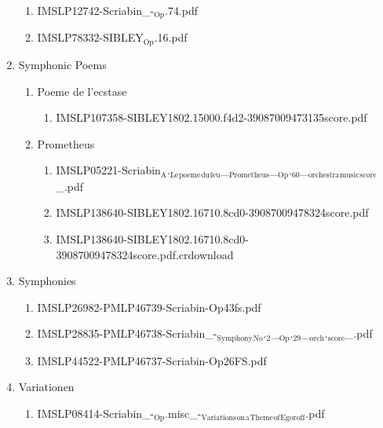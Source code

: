 \documentclass[11pt]{article}
\begin{document}
\begin{enumerate}
\begin{enumerate}
\item IMSLP12742-Scriabin\_-$_{\text{Op}}$.74.pdf
\label{sec-1-1-1-1-44-63-13-16}

\item IMSLP78332-SIBLEY$_{\text{Op}}$.16.pdf
\label{sec-1-1-1-1-44-63-13-17}
\end{enumerate}

\item Symphonic Poems
\label{sec-1-1-1-1-44-63-14}
\begin{enumerate}
\item Poeme de l'ecstase
\label{sec-1-1-1-1-44-63-14-1}
\begin{enumerate}
\item IMSLP107358-SIBLEY1802.15000.f4d2-39087009473135score.pdf
\label{sec-1-1-1-1-44-63-14-1-1}
\end{enumerate}

\item Prometheus
\label{sec-1-1-1-1-44-63-14-2}
\begin{enumerate}
\item IMSLP05221-Scriabin$_{\text{A}}$.$_{\text{Le}}$$_{\text{poeme}}$$_{\text{du}}$$_{\text{feu}}$\_$_{\text{Prometheus}}$\_$_{\text{Op}}$.$_{\text{60}}$\_$_{\text{orchestra}}$$_{\text{music}}$$_{\text{score}}$\_.pdf
\label{sec-1-1-1-1-44-63-14-2-1}

\item IMSLP138640-SIBLEY1802.16710.8cd0-39087009478324score.pdf
\label{sec-1-1-1-1-44-63-14-2-2}

\item IMSLP138640-SIBLEY1802.16710.8cd0-39087009478324score.pdf.crdownload
\label{sec-1-1-1-1-44-63-14-2-3}
\end{enumerate}
\end{enumerate}

\item Symphonies
\label{sec-1-1-1-1-44-63-15}
\begin{enumerate}
\item IMSLP26982-PMLP46739-Scriabin-Op43fs.pdf
\label{sec-1-1-1-1-44-63-15-1}

\item IMSLP28835-PMLP46738-Scriabin\_-$_{\text{Symphony}}$$_{\text{No}}$.$_{\text{2}}$\_$_{\text{Op}}$.$_{\text{29}}$\_$_{\text{orch}}$.$_{\text{score}}$\_.pdf
\label{sec-1-1-1-1-44-63-15-2}

\item IMSLP44522-PMLP46737-Scriabin-Op26FS.pdf
\label{sec-1-1-1-1-44-63-15-3}
\end{enumerate}

\item Variationen
\label{sec-1-1-1-1-44-63-16}
\begin{enumerate}
\item IMSLP08414-Scriabin\_-$_{\text{Op}}$.misc\_-$_{\text{Variations}}$$_{\text{on}}$$_{\text{a}}$$_{\text{Theme}}$$_{\text{of}}$$_{\text{Egoroff}}$.pdf
\label{sec-1-1-1-1-44-63-16-1}
\end{enumerate}
\end{enumerate}
\end{document}

